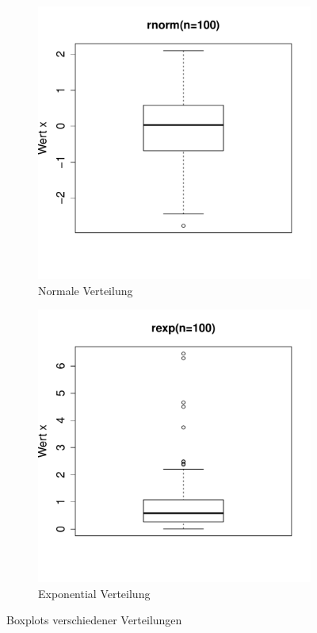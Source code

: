 \begin{figure}[h!]
\begin{subfigure}[b]{0.48\textwidth}
\includegraphics{r-cmd-023}
\caption{Normale Verteilung}
\end{subfigure}
\begin{subfigure}[b]{0.48\textwidth}
\includegraphics{r-cmd-024}
\caption{Exponential Verteilung}
\end{subfigure}
\caption{Boxplots verschiedener Verteilungen}
\end{figure}
